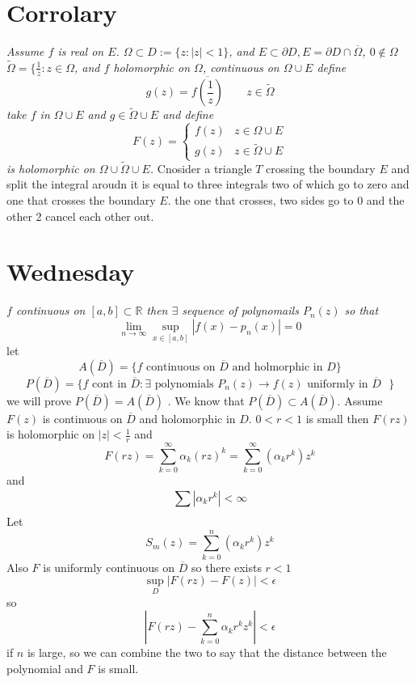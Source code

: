\documentclass[11pt]{article}
\begin{document}
\section{Corrolary}
\emph{
    Assume $f$ is real on $ E$.
    $\Omega \subset  D := \{z : |z| < 1\}$, and $E \subset \partial D, E = \partial D \cap \overline{\Omega}$, $0 \not\in \Omega$ 
    $\tilde \Omega = \{\frac{1}{\overline{ z}} : z \in \Omega$,
    and $f$ holomorphic on $\Omega$, continuous on $\Omega \cup E$
    define 
    \[
    g(z) = \overline{f(\frac{1}{z})} \qquad z \in \tilde \Omega
    \] 
    take $f $ in  $\Omega \cup E$ and  $g \in \tilde \Omega \cup E$ and define
     \[
    F(z) =
    \begin{cases}
        f(z) & z \in \Omega \cup E\\
        g(z) & z \in \tilde \Omega \cup E
    \end{cases}
    \] 
    is holomorphic on $\Omega \cup \tilde \Omega \cup E$.
}
Cnosider a triangle $T$ crossing the boundary $E$ and split the integral aroudn it is equal to three integrals two of which go to zero and one that crosses the boundary  $E$. the one that crosses,
two sides go to 0 and the other 2 cancel each other out.

\section{Wednesday}
\emph{
    $f$ continuous on $[a,b] \subset \mathbb{R}$ then $\exists$ sequence of polynomails  $P_n(z)$ so that
     \[
         \lim_{n\to \infty} \sup_{x \in [a,b]} |f(x) - p_n(x)| = 0
    \] 
}
let
\[
    A( \overline{ D}) = \{f \text{ continuous on $\overline{ D}$ and holmorphic in $D$}\} 
\] 
\[
    P( \overline{ D}) = \{f \text{ cont in $\overline{ D}$}: \exists \text{ polynomials $P_n(z) \rightarrow f(z)$ uniformly in $\overline{ D}$ } \}
\] 
we will prove $P( \overline{ D}) = A( \overline{ D})$ .
We know that $P( \overline{ D}) \subset A( \overline{ D})$.
Assume $F(z)$ is continuous on  $\overline{ D}$ and holomorphic in $ D$.
$0 < r < 1$ is small then  $F(rz)$ is holomorphic on  $|z| < \frac{1}{r}$ and 
\[
F(rz) = \sum_{k=0}^{\infty}\alpha_k (rz)^{k} = \sum_{k=0}^{\infty}(\alpha_k r^{k})z^{k}
\] 
and
\[
\sum_{}^{}|\alpha_k r^{k}| < \infty
\] 
Let
\[
S_m(z) = \sum_{k=0}^{n}(\alpha_kr^{k})z^{k}
\] 
Also $F$ is uniformly continuous on $  \overline{ D}$ so there exists $r < 1$
\[
\sup_D |F(rz) - F(z)| < \epsilon
\] 
so
\[
|F(rz) - \sum_{k=0}^{n}\alpha_kr^{k}z^{k}| < \epsilon
\] 
if $n$ is large, so we can combine the two to say that the distance between the polynomial and $F$ is small.
\end{document}
